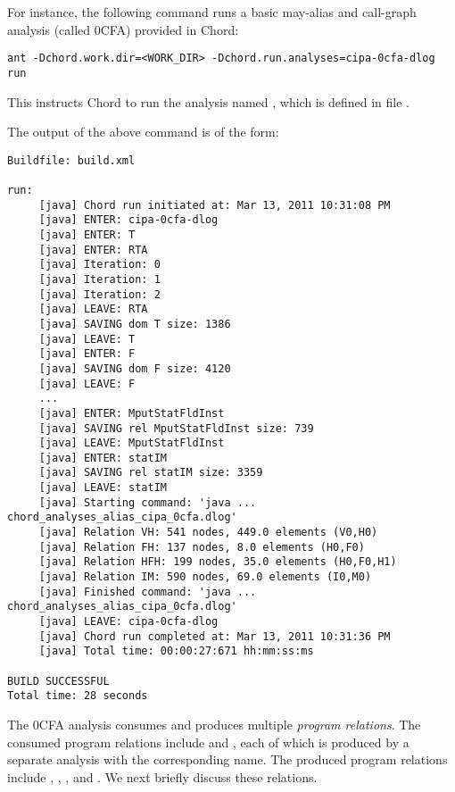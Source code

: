 For instance, the following command runs a basic may-alias and call-graph
analysis (called 0CFA) provided in Chord:

\begin{framed}
\begin{verbatim}
ant -Dchord.work.dir=<WORK_DIR> -Dchord.run.analyses=cipa-0cfa-dlog run
\end{verbatim}
\end{framed}

This instructs Chord to run the analysis named ,
which is defined in file .

The output of the above command is of the form:

\begin{framed}
{\small
\begin{verbatim}
Buildfile: build.xml

run:
     [java] Chord run initiated at: Mar 13, 2011 10:31:08 PM
     [java] ENTER: cipa-0cfa-dlog
     [java] ENTER: T
     [java] ENTER: RTA
     [java] Iteration: 0
     [java] Iteration: 1
     [java] Iteration: 2
     [java] LEAVE: RTA
     [java] SAVING dom T size: 1386
     [java] LEAVE: T
     [java] ENTER: F
     [java] SAVING dom F size: 4120
     [java] LEAVE: F
     ...
     [java] ENTER: MputStatFldInst
     [java] SAVING rel MputStatFldInst size: 739
     [java] LEAVE: MputStatFldInst
     [java] ENTER: statIM
     [java] SAVING rel statIM size: 3359
     [java] LEAVE: statIM
     [java] Starting command: 'java ... chord_analyses_alias_cipa_0cfa.dlog'
     [java] Relation VH: 541 nodes, 449.0 elements (V0,H0)
     [java] Relation FH: 137 nodes, 8.0 elements (H0,F0)
     [java] Relation HFH: 199 nodes, 35.0 elements (H0,F0,H1)
     [java] Relation IM: 590 nodes, 69.0 elements (I0,M0)
     [java] Finished command: 'java ... chord_analyses_alias_cipa_0cfa.dlog'
     [java] LEAVE: cipa-0cfa-dlog
     [java] Chord run completed at: Mar 13, 2011 10:31:36 PM
     [java] Total time: 00:00:27:671 hh:mm:ss:ms

BUILD SUCCESSFUL
Total time: 28 seconds
\end{verbatim}
}
\end{framed}

The 0CFA analysis consumes and produces multiple {\it program relations}.  The
consumed program relations include  and ,
each of which is produced by a separate analysis with the corresponding name.
The produced program relations include , , , and
.  We next briefly discuss these relations.

